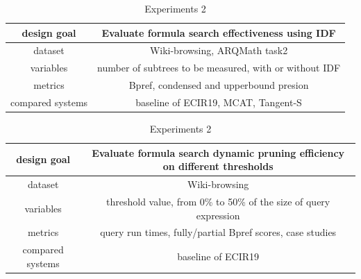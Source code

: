 \documentclass[11pt]{artikel3}
\begin{document}
\begin{table}

	\raggedright



    \caption{Experiments 1}

    \begin{tabular}{c|c}

		\hline

		design goal & Evaluate formula search effectiveness using IDF \\

		\hline

		dataset & Wiki-browsing, ARQMath task2  \\

	    \hline

		variables & number of subtrees to be measured, with or without IDF \\

		\hline

		metrics & Bpref, condensed and upperbound presion \\

		\hline

		compared systems & baseline of ECIR19, MCAT, Tangent-S

	\end{tabular}



	\vspace{1cm}

    \caption{Experiments 2}

    \begin{tabular}{c|c}

		\hline

		design goal & Evaluate formula search dynamic pruning efficiency on different thresholds \\

		\hline

		dataset & Wiki-browsing \\

	    \hline

		variables & threshold value, from 0\% to 50\% of the size of query expression \\

		\hline

		metrics & query run times, fully/partial Bpref scores, case studies \\

		\hline

		compared systems & baseline of ECIR19 \\


\end{tabular}
\end{table}
\end{document}
